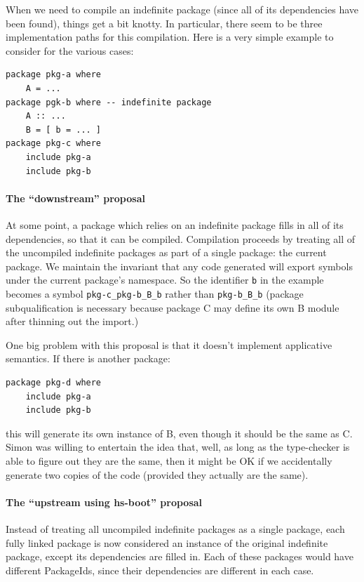 \documentclass{article}
\begin{document}
When we need to compile an indefinite package (since all of its
dependencies have been found), things get a bit knotty.  In particular,
there seem to be three implementation paths for this compilation.  Here
is a very simple example to consider for the various cases:

\begin{verbatim}
package pkg-a where
    A = ...
package pgk-b where -- indefinite package
    A :: ...
    B = [ b = ... ]
package pkg-c where
    include pkg-a
    include pkg-b
\end{verbatim}

\paragraph{The ``downstream'' proposal}  At some point, a package which
relies on an indefinite package fills in all of its dependencies, so
that it can be compiled.  Compilation proceeds by treating all of the
uncompiled indefinite packages as part of a single package: the current
package.  We maintain the invariant that any code generated will export
symbols under the current package's namespace.  So the identifier
\verb|b| in the example becomes a symbol \verb|pkg-c_pkg-b_B_b| rather
than \verb|pkg-b_B_b| (package subqualification is necessary because
package C may define its own B module after thinning out the import.)

One big problem with this proposal is that it doesn't implement applicative
semantics.  If there is another package:

\begin{verbatim}
package pkg-d where
    include pkg-a
    include pkg-b
\end{verbatim}

this will generate its own instance of B, even though it should be the same
as C.  Simon was willing to entertain the idea that, well, as long as the
type-checker is able to figure out they are the same, then it might be OK
if we accidentally generate two copies of the code (provided they actually
are the same).

\paragraph{The ``upstream using hs-boot'' proposal}  Instead of treating all
uncompiled indefinite packages as a single package, each fully linked
package is now considered an instance of the original indefinite
package, except its dependencies are filled in.  Each of these packages
would have different PackageIds, since their dependencies are different
in each case.
\end{document}
